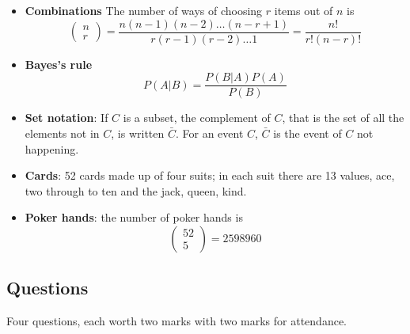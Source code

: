 \documentclass[11pt,a4paper]{scrartcl}
\begin{document}
\begin{itemize}

\item \textbf{Combinations} The number of ways of choosing $r$ items out of $n$ is 
\begin{equation}
\left(\begin{array}{c}n\\r\end{array}\right)=\frac{n(n-1)(n-2)\ldots(n-r+1)}{r(r-1)(r-2)\ldots 1}=\frac{n!}{r!(n-r)!} 
\end{equation}

\item \textbf{Bayes's rule}
\begin{equation}
P(A|B)=\frac{P(B|A)P(A)}{P(B)}
\end{equation}

\item \textbf{Set notation}: If $C$ is a subset, the complement of $C$, that is the set of all the elements not in $C$, is written $\bar{C}$. For an event $C$, $\bar{C}$ is the event of $C$ not happening.
 
\item \textbf{Cards}: 52 cards made up of four suits; in each suit
  there are 13 values, ace, two through to ten and the jack, queen,
  kind.

\item \textbf{Poker hands}: the number of poker hands is 
\begin{equation}
\left(\begin{array}{c}52\\5\end{array}\right)= 2598960
\end{equation}

\end{itemize}

\newpage

\subsection*{Questions}

Four questions, each worth two marks with two marks for attendance.
\end{document}
